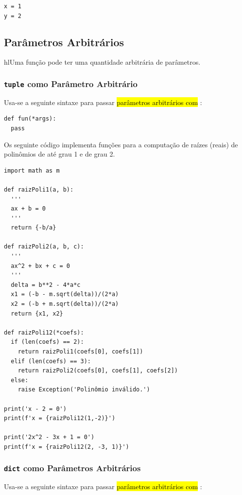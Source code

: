 \begin{verbatim}
x = 1
y = 2  
\end{verbatim}

\subsection{Parâmetros Arbitrários}

hl{Uma função pode ter uma quantidade arbitrária de parâmetros}.

\subsubsection{\texttt{tuple} como Parâmetro Arbitrário}

Usa-se a seguinte sintaxe para passar \hl{parâmetros arbitrários com {\PYTHONtuple}}:

\begin{lstlisting}
def fun(*args):
  pass
\end{lstlisting}

\begin{ex}
  Os seguinte código implementa funções para a computação de raízes (reais) de polinômios de até grau 1 e de grau 2.

\begin{lstlisting}
import math as m

def raizPoli1(a, b):
  '''
  ax + b = 0
  '''
  return {-b/a}

def raizPoli2(a, b, c):
  '''
  ax^2 + bx + c = 0
  '''
  delta = b**2 - 4*a*c
  x1 = (-b - m.sqrt(delta))/(2*a)
  x2 = (-b + m.sqrt(delta))/(2*a)
  return {x1, x2}

def raizPoli12(*coefs):
  if (len(coefs) == 2):
    return raizPoli1(coefs[0], coefs[1])
  elif (len(coefs) == 3):
    return raizPoli2(coefs[0], coefs[1], coefs[2])
  else:
    raise Exception('Polinômio inválido.')

print('x - 2 = 0')
print(f'x = {raizPoli12(1,-2)}')

print('2x^2 - 3x + 1 = 0')
print(f'x = {raizPoli12(2, -3, 1)}')
\end{lstlisting}

\end{ex}

\subsubsection{\texttt{dict} como Parâmetros Arbitrários}

Usa-se a seguinte sintaxe para passar \hl{parâmetros arbitrários com {\PYTHONdict}}:

